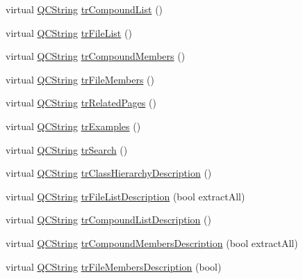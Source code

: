 \begin{DoxyCompactItemize}
\item 
virtual \mbox{\hyperlink{class_q_c_string}{Q\+C\+String}} \mbox{\hyperlink{class_translator_japanese_a45a18ebd0370b6b778e5c00670800f45}{tr\+Compound\+List}} ()
\item 
virtual \mbox{\hyperlink{class_q_c_string}{Q\+C\+String}} \mbox{\hyperlink{class_translator_japanese_ac148fa286f2272c5b9f3eba1e1e7a999}{tr\+File\+List}} ()
\item 
virtual \mbox{\hyperlink{class_q_c_string}{Q\+C\+String}} \mbox{\hyperlink{class_translator_japanese_a908f5ff2ed76ee4a3551dfed32ca13f9}{tr\+Compound\+Members}} ()
\item 
virtual \mbox{\hyperlink{class_q_c_string}{Q\+C\+String}} \mbox{\hyperlink{class_translator_japanese_a9c84ad85b63c6806faa49dcf310d361d}{tr\+File\+Members}} ()
\item 
virtual \mbox{\hyperlink{class_q_c_string}{Q\+C\+String}} \mbox{\hyperlink{class_translator_japanese_a107f31a390f322d8d20c73ac5732f249}{tr\+Related\+Pages}} ()
\item 
virtual \mbox{\hyperlink{class_q_c_string}{Q\+C\+String}} \mbox{\hyperlink{class_translator_japanese_a9156009f1d3b6509fea32f5da43ffd66}{tr\+Examples}} ()
\item 
virtual \mbox{\hyperlink{class_q_c_string}{Q\+C\+String}} \mbox{\hyperlink{class_translator_japanese_aa2ecc8562e45c1e8ee020cd2a51923a1}{tr\+Search}} ()
\item 
virtual \mbox{\hyperlink{class_q_c_string}{Q\+C\+String}} \mbox{\hyperlink{class_translator_japanese_af1edda6affca4f6f036214e25b62b830}{tr\+Class\+Hierarchy\+Description}} ()
\item 
virtual \mbox{\hyperlink{class_q_c_string}{Q\+C\+String}} \mbox{\hyperlink{class_translator_japanese_a171ccbfdd6e05fe54ae1ebcb43c19e47}{tr\+File\+List\+Description}} (bool extract\+All)
\item 
virtual \mbox{\hyperlink{class_q_c_string}{Q\+C\+String}} \mbox{\hyperlink{class_translator_japanese_a90bdebbd4af4fc90cc7d19188a785215}{tr\+Compound\+List\+Description}} ()
\item 
virtual \mbox{\hyperlink{class_q_c_string}{Q\+C\+String}} \mbox{\hyperlink{class_translator_japanese_ada64de6ac856c538fca1420ed6e1ca46}{tr\+Compound\+Members\+Description}} (bool extract\+All)
\item 
virtual \mbox{\hyperlink{class_q_c_string}{Q\+C\+String}} \mbox{\hyperlink{class_translator_japanese_a4dde09015f9b85617fcc24ff893a085e}{tr\+File\+Members\+Description}} (bool)
\item 

\end{DoxyCompactItemize}
